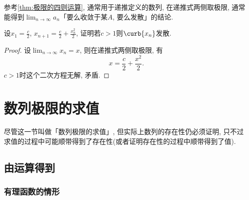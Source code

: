 \documentclass{ctexart}
\begin{document}
参考\cref{thm:极限的四则运算}, 通常用于递推定义的数列, 在递推式两侧取极限, 通常能得到$\displaystyle \lim_{n\rightarrow \infty} a_n$「要么收敛于某$A$, 要么发散」的结论.
\begin{sample}
    \begin{ex}
        设$\displaystyle x_1 = \frac{c}{2}$, $\displaystyle x_{n+1} = \frac{c}{2} + \frac{x_n^2}{2}$, 证明若$c>1$则$\curb{x_n}$发散.
    \end{ex}
    \begin{proof}
        设$\displaystyle \lim_{n\rightarrow \infty} x_n = x$, 则在递推式两侧取极限, 有
        \[ x = \frac{c}{2} + \frac{x^2}{2}. \]
        $c>1$时这个二次方程无解, 矛盾.
    \end{proof}
\end{sample}




\section{数列极限的求值} %
\label{sec:数列极限的求值}

\begin{pitfall}
    尽管这一节叫做「数列极限的求值」, 但实际上数列的存在性仍必须证明, 只不过求值的过程中可能顺带得到了存在性(或者证明存在性的过程中顺带得到了值).
\end{pitfall}

\subsection{由运算得到} %
\label{sub:由运算得到}

\subsubsection{有理函数的情形} %
\label{ssub:有理函数的情形}
\end{document}
